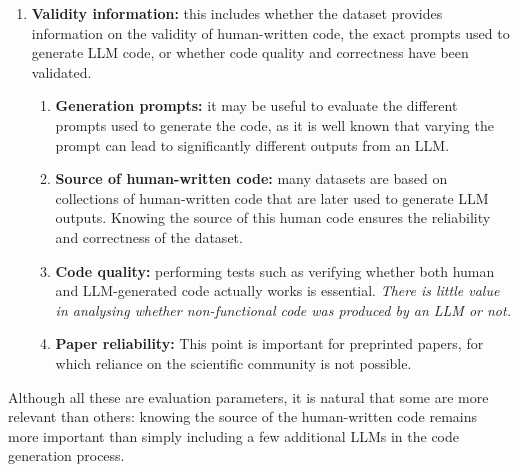 \begin{enumerate}
    \item \textbf{Validity information:} 
    this includes whether the dataset provides information on the 
    validity of human-written code, the exact prompts used to generate 
    LLM code, or whether code quality and correctness have been validated.
    \begin{enumerate}
        \item \textbf{Generation prompts:}
        it may be useful to evaluate the different 
        prompts used to generate the code, as it is 
        well known that varying the prompt can lead to 
        significantly different outputs from an LLM.
        \item \textbf{Source of human-written code:}
        many datasets are based on collections of human-written 
        code that are later used to generate LLM outputs. Knowing 
        the source of this human code ensures the reliability 
        and correctness of the dataset.
        \item \textbf{Code quality:}
        performing tests such as verifying whether 
        both human and LLM-generated code actually 
        works is essential. \textit{There is little value in 
        analysing whether non-functional code was 
        produced by an LLM or not.}
        \item \textbf{Paper reliability:} 
        This point is important for preprinted papers, 
        for which reliance on the scientific community is 
        not possible.
    \end{enumerate}

\end{enumerate}


Although all these are evaluation parameters, it is natural that some 
are more relevant than others: knowing the source of the human-written 
code remains more important than simply including a few additional LLMs 
in the code generation process.
